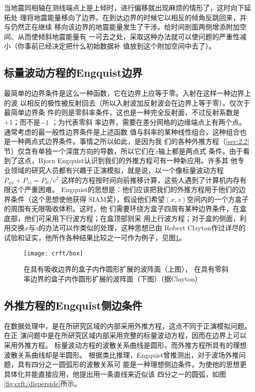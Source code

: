 当地震同相轴在测线端点上是上倾时，进行偏移就出现麻烦的情形了，这时向下延拓处
理将地震能量移向了边界。在到达边界的时候它以相反的倾角反跳回来，并与仍然正在继续
移向该边界的地震能量发生了干涉。给时间剖面两侧增添附加空间、从而使倾斜地震能量有
一可去之处，采取这种办法就可以使问题的严重性减小（你事前已经决定把什么初始数据补
值放到这个附加空间中去了）。


\subsection{标量波动方程的Engquist边界}
\label{sec:4.4.3}

最简单的边界条件是这么一种函数，它在边界上应等于零。入射在这样一种边界上的波
以相反的极性被反射回去（所以入射波加反射波会在边界上等于零）。仅次于最简单边界条
件的则是零斜率条件，这也是一种完全反射面，不过反射系数是+1；而不是$-1$
；为代表零斜
率边界，需要在差分网格的边缘端点上有两个点。通常考虑的最一般性边界条件是上述函数
值与斜率的某种线性组合，这种组合也是一种两点式边界条件。事情之所以如此，是因为我
们的各种外推方程（\ref{sec:2.2}节）仅含有单独一个深度方向的导数，所以它们在$z$轴上都是两点式
条件。由于看到了这点，Bjorn
Engquist认识到我们的外推方程可有一种新应用。许多其
他专业领域的研究人员都有兴趣于正演模拟，就是说，以一个像标量波动方程
$P_{xx}+P_{zz}=P_{tt}/v^2$
这样的方程按时间向前推移计算，这些人遇到了计算机内存有限这个严重困难。
Engquist的思想是：他们应该把我们的外推方程用于他们的边界条件（这个思想使他获得
SIAM奖），假设他们希望$(x,z)$空间内的一个方盒子的周围有无限吸收体积。这时，他
们需要环绕方盒子四周有某种边界条件，在盒底部，他们可采用下行波方程；在盒顶部则采
用上行波方程；对于盒的侧面，利用交换$x$与$z$的办法可以作类似的处理，这种思想已由
Robert Clayton作过详尽的试验和证实，他所作各种结果比较之一可作为例子，见图\ref{fig:crft/box}。

\begin{figure}[H]
\centering
\texttt{[image: crft/box]}
\caption[box]{在具有吸收边界的盒子内作圆形扩展的波阵面（上图），
在具有零斜率边界的盒子内作圆形扩展的波阵面（下图）（据Clayton）}
\label{fig:crft/box}
\end{figure}

\subsection{外推方程的Engquist侧边条件}
\label{sec:4.4.4}

在数据处理中，是在所研究区域的内部采用外推方程，这点不同于正演模拟问题。在正
演问题中是在所研究区域内部采用完整的标量波动方程，因而在边界上可以采用外推方程。
标量波动方程的波散关系曲线是圆形，而外推方程所具有的理想波散关系曲线却是半圆形。
根据类比推理，Engquist曾推测出，对于波场外推问题，具有四分之一圆弧形的波散关系可
能是一种理想侧边条件。为使他的思想更具体化并能直接应用，他提出用一条直线来近似该
四分之一的圆弧，如图\ref{fig:crft/disperside}所示。

